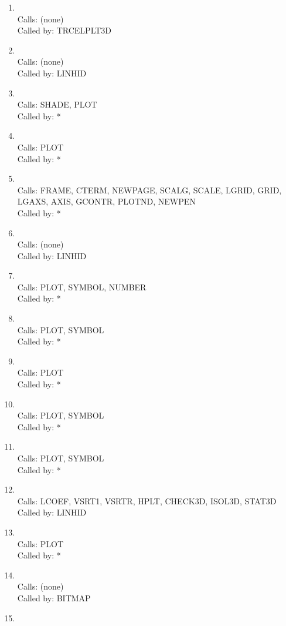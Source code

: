 \documentclass[11pt]{report}
\begin{document}
\begin{enumerate}
\item {}
\\ Calls:  (none)
\\ Called by: TRCELPLT3D
\item {}
\\ Calls:  (none)
\\ Called by: LINHID
\item {}
\\ Calls:  SHADE, PLOT
\\ Called by: *
\item {}
\\ Calls:  PLOT
\\ Called by: *
\item {}
\\ Calls:  FRAME, CTERM, NEWPAGE, SCALG, SCALE, LGRID, GRID,
LGAXS, AXIS, GCONTR, PLOTND, NEWPEN
\\ Called by: *
\item {}
\\ Calls:  (none)
\\ Called by: LINHID
\item {}
\\ Calls:  PLOT, SYMBOL, NUMBER
\\ Called by: *
\item {}
\\ Calls:  PLOT, SYMBOL
\\ Called by: *
\item {}
\\ Calls:  PLOT
\\ Called by: *
\item {}
\\ Calls:  PLOT, SYMBOL
\\ Called by: *
\item {}
\\ Calls:  PLOT, SYMBOL
\\ Called by: *
\item {}
\\ Calls:  LCOEF, VSRT1, VSRTR, HPLT, CHECK3D, ISOL3D, STAT3D
\\ Called by: LINHID
\item {}
\\ Calls:  PLOT
\\ Called by: *
\item {}
\\ Calls:  (none)
\\ Called by: BITMAP
\item {}

\end{enumerate}
\end{document}
